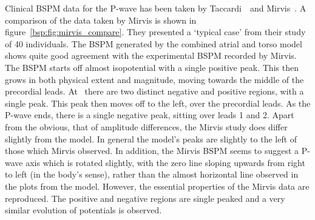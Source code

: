 Clinical BSPM data for the P-wave has been taken by
Taccardi~\cite{Taccardi1966}\ and Mirvis~\cite{Mirvis1980}.
A comparison of the data taken by Mirvis is shown in
figure~\ref{bsp:fig:mirvis_compare}.
They presented a `typical case' from their study of 40 individuals.
The BSPM generated by the combined atrial and torso model shows quite good
agreement with the experimental BSPM recorded by Mirvis.
The BSPM starts off almost isopotential with a single positive peak.
This then grows in both physical extent and magnitude, moving towards the middle
of the precordial leads.
At \ there are two distinct negative and positive regions, with a single
peak.
This peak then moves off to the left, over the precordial leads.
As the P-wave ends, there is a single negative peak, sitting over leads 1 and 2.
Apart from the obvious, that of amplitude differences, the Mirvis study does
differ slightly from the model.
In general the model's peaks are slightly to the left of those which Mirvis
observed.
In addition, the Mirvis BSPM seems to suggest a P-wave axis which is rotated
slightly, with the zero line sloping upwards from right to left (in the body's
sense), rather than the almost horizontal line observed in the plots from the
model.
However, the essential properties of the Mirvis data are reproduced.
The positive and negative regions are single peaked and a very similar evolution
of potentials is observed.

